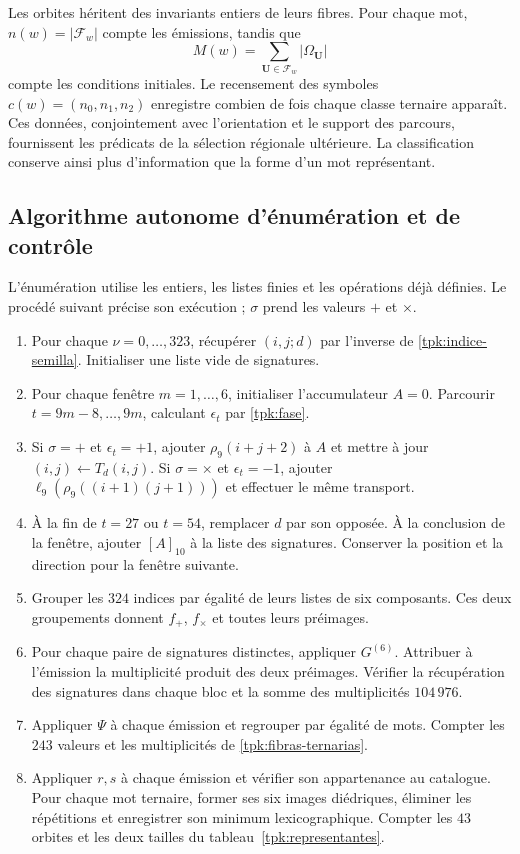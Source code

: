 Les orbites héritent des invariants entiers de leurs fibres. Pour chaque mot,
\(n(w)=|\mathcal F_w|\) compte les émissions, tandis que
\[
 M(w)=\sum_{\mathbf U\in\mathcal F_w}|\Omega_{\mathbf U}|
\]
compte les conditions initiales. Le recensement des symboles
\(c(w)=(n_0,n_1,n_2)\) enregistre combien de fois chaque classe ternaire apparaît.
Ces données, conjointement avec l'orientation et le support des parcours,
fournissent les prédicats de la sélection régionale ultérieure. La
classification conserve ainsi plus d'information que la forme d'un mot
représentant.

\subsection{Algorithme autonome d'énumération et de contrôle}
\label{tpk:algoritmo}

L'énumération utilise les entiers, les listes finies et les opérations déjà définies.  
Le procédé suivant précise son exécution ; \(\sigma\) prend les valeurs  
\(+\) et \(\times\).

\begin{enumerate}
\item Pour chaque \(\nu=0,\ldots,323\), récupérer \((i,j;d)\) par
l'inverse de \eqref{tpk:indice-semilla}. Initialiser une liste vide de signatures.
\item Pour chaque fenêtre \(m=1,\ldots,6\), initialiser l'accumulateur \(A=0\).
Parcourir \(t=9m-8,\ldots,9m\), calculant \(\epsilon_t\) par
\eqref{tpk:fase}.
\item Si \(\sigma=+\) et \(\epsilon_t=+1\), ajouter
\(\rho_9(i+j+2)\) à \(A\) et mettre à jour
\((i,j)\leftarrow T_d(i,j)\). Si \(\sigma=\times\) et
\(\epsilon_t=-1\), ajouter
\(\ell_9(\rho_9((i+1)(j+1)))\) et effectuer le même transport.
\item À la fin de \(t=27\) ou \(t=54\), remplacer \(d\) par son opposée.  
À la conclusion de la fenêtre, ajouter \([A]_{10}\) à la liste des signatures.  
Conserver la position et la direction pour la fenêtre suivante.
\item Grouper les \(324\) indices par égalité de leurs listes de six
composants. Ces deux groupements donnent \(f_+\), \(f_\times\) et toutes
leurs préimages.
\item Pour chaque paire de signatures distinctes, appliquer \(G^{(6)}\).
Attribuer à l'émission la multiplicité produit des deux préimages.
Vérifier la récupération des signatures dans chaque bloc et la somme des
multiplicités \(104\,976\).
\item Appliquer \(\Psi\) à chaque émission et regrouper par égalité de mots.
Compter les \(243\) valeurs et les multiplicités de
\eqref{tpk:fibras-ternarias}.
\item Appliquer \(r,s\) à chaque émission et vérifier son appartenance au catalogue.
Pour chaque mot ternaire, former ses six images diédriques, éliminer les
répétitions et enregistrer son minimum lexicographique. Compter les \(43\)
orbites et les deux tailles du tableau~\ref{tpk:representantes}.
\end{enumerate}

